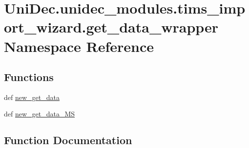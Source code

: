 \hypertarget{namespace_uni_dec_1_1unidec__modules_1_1tims__import__wizard_1_1get__data__wrapper}{}\section{Uni\+Dec.\+unidec\+\_\+modules.\+tims\+\_\+import\+\_\+wizard.\+get\+\_\+data\+\_\+wrapper Namespace Reference}
\label{namespace_uni_dec_1_1unidec__modules_1_1tims__import__wizard_1_1get__data__wrapper}
\subsection*{Functions}
\begin{DoxyCompactItemize}
\item 
def \hyperlink{namespace_uni_dec_1_1unidec__modules_1_1tims__import__wizard_1_1get__data__wrapper_ae605cf083dc9b52a108e7ddaca55c9ed}{new\+\_\+get\+\_\+data}
\item 
def \hyperlink{namespace_uni_dec_1_1unidec__modules_1_1tims__import__wizard_1_1get__data__wrapper_a2fd47467da04fa6c36345a652430d561}{new\+\_\+get\+\_\+data\+\_\+\+M\+S}
\end{DoxyCompactItemize}


\subsection{Function Documentation}
\hypertarget{namespace_uni_dec_1_1unidec__modules_1_1tims__import__wizard_1_1get__data__wrapper_ae605cf083dc9b52a108e7ddaca55c9ed}{}
